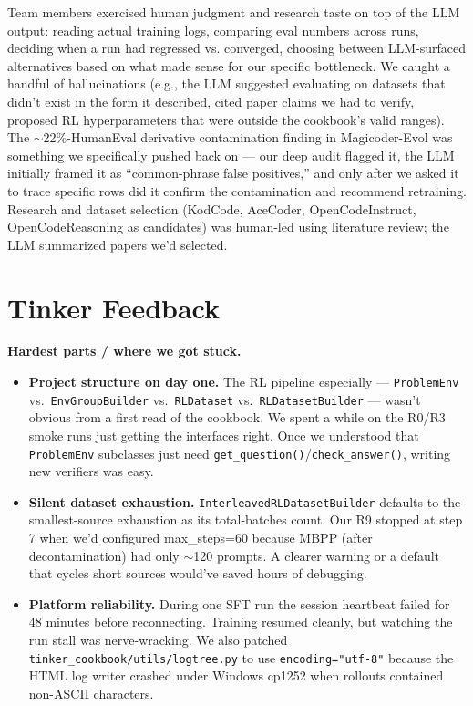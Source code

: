 \documentclass[11pt]{article}
\begin{document}
Team members exercised human judgment and research taste on top of the LLM output: reading actual training logs, comparing eval numbers across runs, deciding when a run had regressed vs. converged, choosing between LLM-surfaced alternatives based on what made sense for our specific bottleneck. We caught a handful of hallucinations (e.g., the LLM suggested evaluating on datasets that didn't exist in the form it described, cited paper claims we had to verify, proposed RL hyperparameters that were outside the cookbook's valid ranges). The $\sim$22\%-HumanEval derivative contamination finding in Magicoder-Evol was something we specifically pushed back on --- our deep audit flagged it, the LLM initially framed it as ``common-phrase false positives,'' and only after we asked it to trace specific rows did it confirm the contamination and recommend retraining. Research and dataset selection (KodCode, AceCoder, OpenCodeInstruct, OpenCodeReasoning as candidates) was human-led using literature review; the LLM summarized papers we'd selected.

\section*{Tinker Feedback}

\textbf{Hardest parts / where we got stuck.}
\begin{itemize}
\setlength\itemsep{-0.2em}
\item \textbf{Project structure on day one.} The RL pipeline especially --- \texttt{ProblemEnv} vs.\ \texttt{EnvGroupBuilder} vs.\ \texttt{RLDataset} vs.\ \texttt{RLDatasetBuilder} --- wasn't obvious from a first read of the cookbook. We spent a while on the R0/R3 smoke runs just getting the interfaces right. Once we understood that \texttt{ProblemEnv} subclasses just need \texttt{get\_question()}/\texttt{check\_answer()}, writing new verifiers was easy.
\item \textbf{Silent dataset exhaustion.} \texttt{InterleavedRLDatasetBuilder} defaults to the smallest-source exhaustion as its total-batches count. Our R9 stopped at step 7 when we'd configured max\_steps=60 because MBPP (after decontamination) had only $\sim$120 prompts. A clearer warning or a default that cycles short sources would've saved hours of debugging.
\item \textbf{Platform reliability.} During one SFT run the session heartbeat failed for 48 minutes before reconnecting. Training resumed cleanly, but watching the run stall was nerve-wracking. We also patched \texttt{tinker\_cookbook/utils/logtree.py} to use \texttt{encoding="utf-8"} because the HTML log writer crashed under Windows cp1252 when rollouts contained non-ASCII characters.
\end{itemize}
\end{document}

